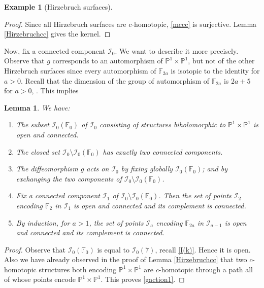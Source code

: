 \documentclass[10pt]{amsart}
\let\mathcal\mathscr
\theoremstyle{plain}
\newtheorem{lemma}[theorem]{Lemma}
\theoremstyle{definition}
\newtheorem{example}[theorem]{Example}
\theoremstyle{remark}
\numberwithin{equation}{section}
\newcommand{\cI}{\mathcal{I}}
\begin{document}
\begin{example}[Hirzebruch surfaces]
\begin{proof}
Since all Hirzebruch surfaces are $c$-homotopic, \eqref{mccc} is surjective. Lemma \ref{Hirzebruchcc} gives the kernel.
\end{proof}

Now, fix a connected component $\cI_0$. We want to describe it more precisely. Observe that $g$ corresponds to an automorphism of $\mathbb P^1\times\mathbb P^1$, but not of the other Hirzebruch surfaces since every automorphism of $\mathbb F_{2a}$ is isotopic to the identity for $a>0$. Recall that the dimension of the group of automorphism of $\mathbb F_{2a}$ is $2a+5$ for $a>0$, \cite[p.\,44]{MK}. This implies
\begin{lemma}
\label{gaction}
We have:
\begin{enumerate}
\item\label{gaction1}
The subset $\cI_0(\mathbb F_0)$ of $\cI_0$ consisting of structures biholomorphic to $\mathbb P^1\times\mathbb P^1$ is open and connected.
\item\label{gaction2}
The closed set $\cI_0\setminus \cI_0(\mathbb F_0)$ has exactly two connected components.
\item\label{gaction3}
The diffeomorphism $g$ acts on $\cI_0$ by fixing globally $\cI_0(\mathbb F_0)$; and by exchanging the two components of $\cI_0\setminus \cI_0(\mathbb F_0)$.
\item\label{gaction4}
Fix a connected component $\cI_1$ of $\cI_0\setminus \cI_0(\mathbb F_0)$. Then the set of points $\cI_2$ encoding $\mathbb F_2$ in $\cI_1$ is open and connected and its complement is connected.
\item\label{gaction5}
By induction, for $a>1$, the set of points $\cI_a$ encoding $\mathbb F_{2a}$ in $\cI_{a-1}$ is open and connected and its complement is connected.
\end{enumerate}
\end{lemma}

\begin{proof}
Observe that $\cI_0(\mathbb F_0)$ is equal to $\cI_0(7)$, recall \eqref{I(k)}. Hence it is open. Also we have already observed in the proof of Lemma \ref{Hirzebruchcc} that two $c$-homotopic structures both encoding $\mathbb P^1\times\mathbb P^1$ are $c$-homotopic through a path all of whose points encode $\mathbb P^1\times\mathbb P^1$. This proves \eqref{gaction1}.


\end{proof}
\end{example}
\end{document}
